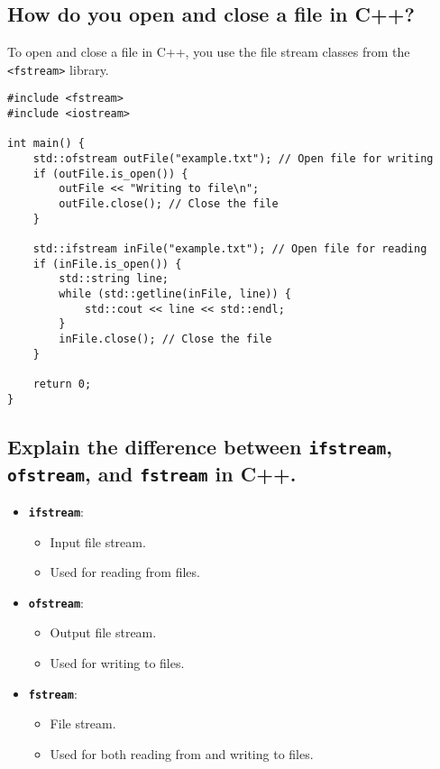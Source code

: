 \subsection{How do you open and close a file in C++?}
To open and close a file in C++, you use the file stream classes from the \texttt{<fstream>} library.
\begin{tcolorbox}[title=File Open and Close]
\begin{verbatim}
#include <fstream>
#include <iostream>

int main() {
    std::ofstream outFile("example.txt"); // Open file for writing
    if (outFile.is_open()) {
        outFile << "Writing to file\n";
        outFile.close(); // Close the file
    }

    std::ifstream inFile("example.txt"); // Open file for reading
    if (inFile.is_open()) {
        std::string line;
        while (std::getline(inFile, line)) {
            std::cout << line << std::endl;
        }
        inFile.close(); // Close the file
    }

    return 0;
}
\end{verbatim}
\end{tcolorbox}

\subsection{Explain the difference between \texttt{ifstream}, \texttt{ofstream}, and \texttt{fstream} in C++.}
\begin{itemize}
    \item \textbf{\texttt{ifstream}}:
    \begin{itemize}
        \item Input file stream.
        \item Used for reading from files.
    \end{itemize}
    
    \item \textbf{\texttt{ofstream}}:
    \begin{itemize}
        \item Output file stream.
        \item Used for writing to files.
    \end{itemize}
    
    \item \textbf{\texttt{fstream}}:
    \begin{itemize}
        \item File stream.
        \item Used for both reading from and writing to files.
    \end{itemize}
\end{itemize}


